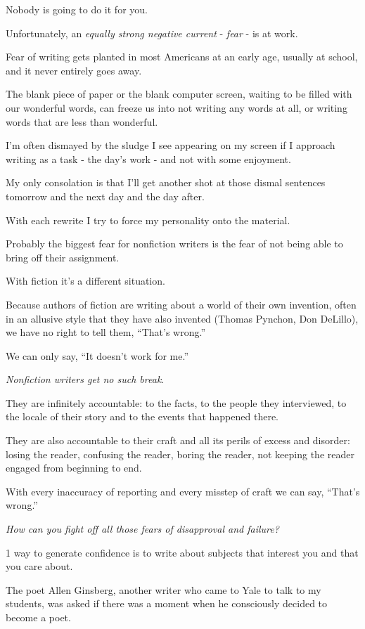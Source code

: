 \documentclass{book}
\numberwithin{equation}{section}
\begin{document}
Nobody is going to do it for you.

%
Unfortunately, an \textit{equally strong negative current} - \textit{fear} - is at work.

Fear of writing gets planted in most Americans at an early age, usually at school, and it never entirely goes away.

The blank piece of paper or the blank computer screen, waiting to be filled with our wonderful words, can freeze us into not writing any words at all, or writing words that are less than wonderful.

I'm often dismayed by the sludge I see appearing on my screen if I approach writing as a task - the day's work - and not with some enjoyment.

My only consolation is that I'll get another shot at those dismal sentences tomorrow and the next day and the day after.

With each rewrite I try to force my personality onto the material.

%
Probably the biggest fear for nonfiction writers is the fear of not being able to bring off their assignment.

With fiction it's a different situation.

Because authors of fiction are writing about a world of their own invention, often in an allusive style that they have also invented (Thomas Pynchon, Don DeLillo), we have no right to tell them, ``That's wrong.''

We can only say, ``It doesn't work for me.''

\textit{Nonfiction writers get no such break}.

They are infinitely accountable: to the facts, to the people they interviewed, to the locale of their story and to the events that happened there.

They are also accountable to their craft and all its perils of excess and disorder: losing the reader, confusing the reader, boring the reader, not keeping the reader engaged from beginning to end.

With every inaccuracy of reporting and every misstep of craft we can say, ``That's wrong.''

\textit{How can you fight off all those fears of disapproval and failure?}

1 way to generate confidence is to write about subjects that interest you and that you care about.

The poet Allen Ginsberg, another writer who came to Yale to talk to my students, was asked if there was a moment when he consciously decided to become a poet.
\end{document}

